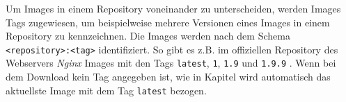 \documentclass[../main.tex]{subfiles}
\begin{document}
			Um Images in einem Repository voneinander zu unterscheiden, werden Images Tags zugewiesen, um beispielweise mehrere Versionen eines Images in einem Repository zu kennzeichnen. Die Images werden nach dem Schema \texttt{<repository>:<tag>} identifiziert. So gibt es z.B. im offiziellen Repository des Webservers \emph{Nginx} Images mit den Tags \texttt{latest}, \texttt{1}, \texttt{1.9} und \texttt{1.9.9} \cite{dockerHubNginx}. Wenn bei dem Download kein Tag angegeben ist, wie in Kapitel wird automatisch das aktuellste Image mit dem Tag \texttt{latest} bezogen.




\end{document}
